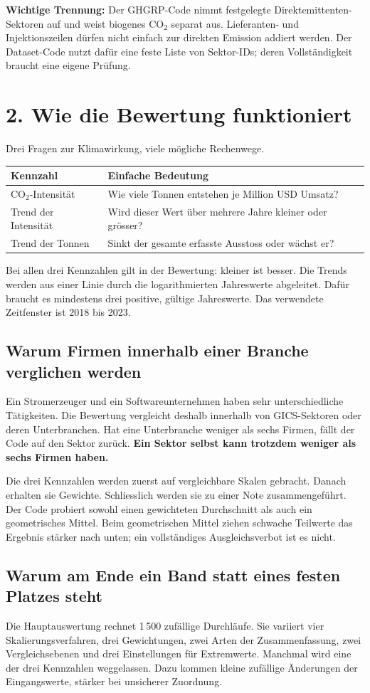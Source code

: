 \documentclass[11pt,a4paper]{article}
\newcommand{\lead}[1]{{\large\sffamily\color{accent}#1}\par}
\newcommand{\page}[2]{\clearpage\section*{#1}\lead{#2}}
\begin{document}
\textbf{Wichtige Trennung:} Der GHGRP-Code nimmt festgelegte Direktemittenten-Sektoren auf und weist biogenes CO$_2$ separat aus. Lieferanten- und Injektionszeilen dürfen nicht einfach zur direkten Emission addiert werden. Der Dataset-Code nutzt dafür eine feste Liste von Sektor-IDs; deren Vollständigkeit braucht eine eigene Prüfung.

\page{2. Wie die Bewertung funktioniert}{Drei Fragen zur Klimawirkung, viele mögliche Rechenwege.}
\begin{tabularx}{\linewidth}{@{}p{43mm}Y@{}}\toprule
Kennzahl & Einfache Bedeutung\\\midrule
CO$_2$-Intensität & Wie viele Tonnen entstehen je Million USD Umsatz?\\
Trend der Intensität & Wird dieser Wert über mehrere Jahre kleiner oder grösser?\\
Trend der Tonnen & Sinkt der gesamte erfasste Ausstoss oder wächst er?\\\bottomrule
\end{tabularx}
Bei allen drei Kennzahlen gilt in der Bewertung: kleiner ist besser. Die Trends werden aus einer Linie durch die logarithmierten Jahreswerte abgeleitet. Dafür braucht es mindestens drei positive, gültige Jahreswerte. Das verwendete Zeitfenster ist 2018 bis 2023.

\subsection*{Warum Firmen innerhalb einer Branche verglichen werden}
Ein Stromerzeuger und ein Softwareunternehmen haben sehr unterschiedliche Tätigkeiten. Die Bewertung vergleicht deshalb innerhalb von GICS-Sektoren oder deren Unterbranchen. Hat eine Unterbranche weniger als sechs Firmen, fällt der Code auf den Sektor zurück. \textbf{Ein Sektor selbst kann trotzdem weniger als sechs Firmen haben.}

Die drei Kennzahlen werden zuerst auf vergleichbare Skalen gebracht. Danach erhalten sie Gewichte. Schliesslich werden sie zu einer Note zusammengeführt. Der Code probiert sowohl einen gewichteten Durchschnitt als auch ein geometrisches Mittel. Beim geometrischen Mittel ziehen schwache Teilwerte das Ergebnis stärker nach unten; ein vollständiges Ausgleichsverbot ist es nicht.

\subsection*{Warum am Ende ein Band statt eines festen Platzes steht}
Die Hauptauswertung rechnet 1\,500 zufällige Durchläufe. Sie variiert vier Skalierungsverfahren, drei Gewichtungen, zwei Arten der Zusammenfassung, zwei Vergleichsebenen und drei Einstellungen für Extremwerte. Manchmal wird eine der drei Kennzahlen weggelassen. Dazu kommen kleine zufällige Änderungen der Eingangswerte, stärker bei unsicherer Zuordnung.
\end{document}
